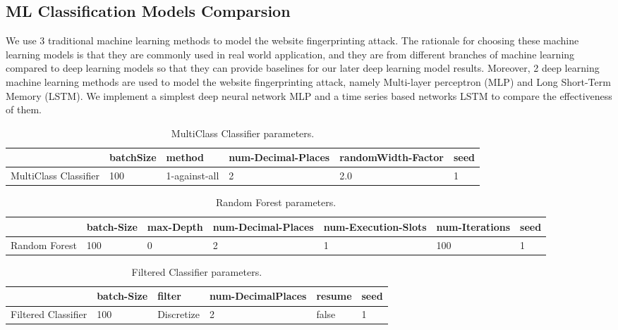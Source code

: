 \documentclass[conference]{IEEEtran}
\begin{document}
\subsection{ML Classification Models Comparsion}
We use 3 traditional machine learning methods to model the website fingerprinting attack. The rationale for choosing these machine learning models is that they are commonly used in real world application, and they are from different branches of machine learning compared to deep learning models so that they can provide baselines for our later deep learning model results. Moreover, 2 deep learning machine learning methods are used to model the website fingerprinting attack, namely Multi-layer perceptron (MLP) and Long Short-Term Memory (LSTM). We implement a simplest deep neural network MLP and a time series based networks LSTM to compare the effectiveness of them.
\begin{table}[h!]
    \caption{MultiClass Classifier parameters.\label{table}}
    \centering
    \begin{tabular}{ | m{4em} | m{4em}|m{3em}|m{3em}|m{6em}|m{2em}| }
      \hline
        & batchSize & method & num-Decimal-Places & randomWidth-Factor & seed  \\ 
      \hline
      MultiClass Classifier & 100 & 1-against-all & 2 & 2.0 & 1\\ 
      \hline
    \end{tabular}
\end{table}

\begin{table}[h!]
    \caption{Random Forest parameters.\label{table}}
    \centering
    \begin{tabular}{ | m{4em} | m{2em}|m{2em}|m{3em}|m{4em}|m{4em}|m{2em} |}
      \hline
            & batch-Size & max-Depth & num-Decimal-Places & num-Execution-Slots & num-Iterations & seed  \\ 
      \hline
      Random Forest & 100 & 0 & 2 & 1 & 100 & 1\\ 
      \hline
    \end{tabular}
\end{table}

\begin{table}[h!]
    \caption{Filtered Classifier parameters.\label{table}}
    \centering
    \begin{tabular}{ | m{4em} | m{2em}|m{4em}|m{6em}|m{3em}|m{2em}|}
      \hline
            & batch-Size & filter & num-DecimalPlaces & resume &  seed  \\ 
      \hline
      Filtered Classifier & 100 & Discretize & 2 & false & 1\\ 
      \hline
    \end{tabular}
\end{table}
\end{document}
